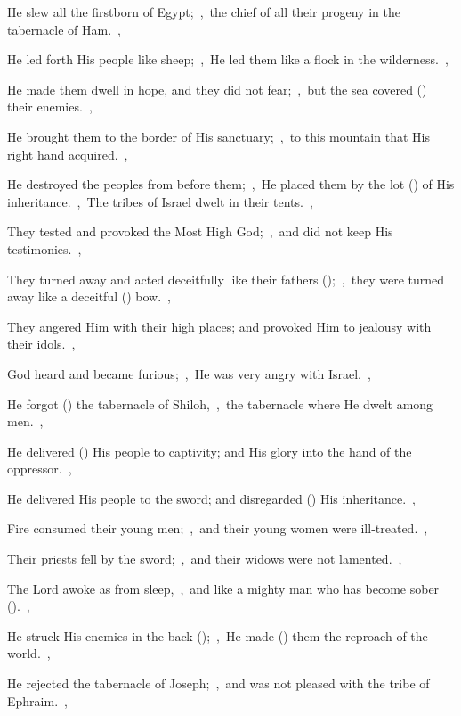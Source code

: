 \documentclass[12pt,twoside,a5paper]{article}
\begin{document}
\begin{halfparskip}
  He slew all the firstborn of Egypt;~\sep\ the chief of all their progeny in the tabernacle of Ham.~\sep

   He led forth His people like sheep;~\sep\ He led them like a flock in the wilderness.~\sep

  He made them dwell in hope, and they did not fear;~\sep\ but the sea covered () their enemies.~\sep

  He brought them to the border of His sanctuary;~\sep\ to this mountain that His right hand acquired.~\sep

  He destroyed the peoples from before them;~\sep\ He placed them by the lot () of His inheritance.~\sep\ The tribes of Israel dwelt in their tents.~\sep

  They tested and provoked the Most High God;~\sep\ and did not keep His testimonies.~\sep

  They turned away and acted deceitfully like their fathers ();~\sep\ they were turned away like a deceitful () bow.~\sep

  They angered Him with their high places; and provoked Him to jealousy with their idols.~\sep

  God heard and became furious;~\sep\ He was very angry with Israel.~\sep

  He forgot () the tabernacle of Shiloh,~\sep\ the tabernacle where He dwelt among men.~\sep

  He delivered () His people to captivity; and His glory into the hand of the oppressor.~\sep


  He delivered His people to the sword; and disregarded () His inheritance.~\sep

  Fire consumed their young men;~\sep\ and their young women were ill-treated.~\sep

  Their priests fell by the sword;~\sep\ and their widows were not lamented.~\sep

  The Lord awoke as from sleep,~\sep\ and like a mighty man who has become sober ().~\sep

  He struck His enemies in the back ();~\sep\ He made () them the reproach of the world.~\sep

  He rejected the tabernacle of Joseph;~\sep\ and was not pleased with the tribe of Ephraim.~\sep


\end{halfparskip}
\end{document}
